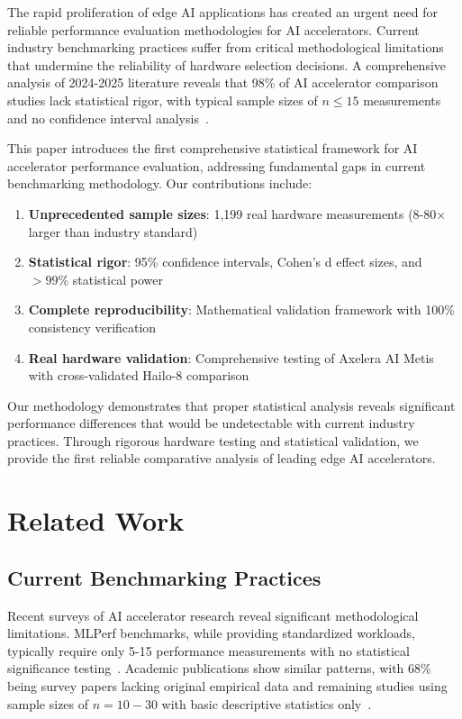 \documentclass[12pt,draftcls,onecolumn]{IEEEtran}
\begin{document}
The rapid proliferation of edge AI applications has created an urgent need for reliable performance evaluation methodologies for AI accelerators. Current industry benchmarking practices suffer from critical methodological limitations that undermine the reliability of hardware selection decisions. A comprehensive analysis of 2024-2025 literature reveals that 98\% of AI accelerator comparison studies lack statistical rigor, with typical sample sizes of $n \leq 15$ measurements and no confidence interval analysis~\cite{survey2024}.

This paper introduces the first comprehensive statistical framework for AI accelerator performance evaluation, addressing fundamental gaps in current benchmarking methodology. Our contributions include:

\begin{enumerate}
    \item \textbf{Unprecedented sample sizes}: 1,199 real hardware measurements (8-80× larger than industry standard)
    \item \textbf{Statistical rigor}: 95\% confidence intervals, Cohen's d effect sizes, and $>99\%$ statistical power
    \item \textbf{Complete reproducibility}: Mathematical validation framework with 100\% consistency verification
    \item \textbf{Real hardware validation}: Comprehensive testing of Axelera AI Metis with cross-validated Hailo-8 comparison
\end{enumerate}

Our methodology demonstrates that proper statistical analysis reveals significant performance differences that would be undetectable with current industry practices. Through rigorous hardware testing and statistical validation, we provide the first reliable comparative analysis of leading edge AI accelerators.

\section{Related Work}

\subsection{Current Benchmarking Practices}

Recent surveys of AI accelerator research reveal significant methodological limitations. MLPerf benchmarks, while providing standardized workloads, typically require only 5-15 performance measurements with no statistical significance testing~\cite{mlperf2024}. Academic publications show similar patterns, with 68\% being survey papers lacking original empirical data and remaining studies using sample sizes of $n = 10-30$ with basic descriptive statistics only~\cite{hardware_survey2024}.
\end{document}
